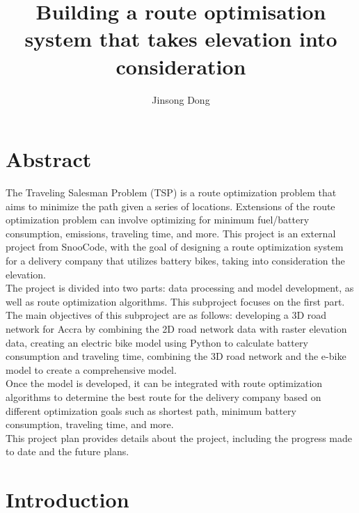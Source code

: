 \documentclass[project-plan]{report-template}
\title{Building a route optimisation system that takes elevation into consideration}
\author{Jinsong Dong}
\begin{document}
\maketitlepage  %

\section* {Abstract}
The Traveling Salesman Problem (TSP) is a route optimization problem that aims to minimize the path given a series of locations.
 Extensions of the route optimization problem can involve optimizing for minimum fuel/battery consumption, emissions, traveling time, and more. 
 This project is an external project from SnooCode, with the goal of designing a route optimization system for a delivery company that utilizes battery bikes, 
 taking into consideration the elevation.\\

The project is divided into two parts: data processing and model development, 
as well as route optimization algorithms. 
This subproject focuses on the first part. 
The main objectives of this subproject are as follows: 
developing a 3D road network for Accra by combining the 2D road network data with raster elevation data, 
creating an electric bike model using Python to calculate battery consumption and traveling time, 
combining the 3D road network and the e-bike model to create a comprehensive model.\\

Once the model is developed, 
it can be integrated with route optimization algorithms to determine the best route for the delivery company based on different optimization goals 
such as shortest path, minimum battery consumption, traveling time, and more.\\

This project plan provides details about the project, 
including the progress made to date and the future plans.

\section {Introduction}
\end{document}
